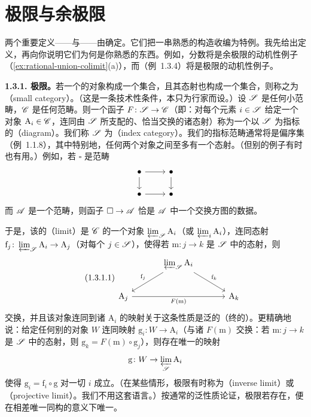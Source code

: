 \section{极限与余极限}

两个重要定义——\trLimit{}与\trColimit——由\trUniversalProperty{}确定。它们把一串熟悉的构造收编为特例。我先给出定义，再向你说明它们为何是你熟悉的东西。例如，分数将是余极限的动机性例子（\cref{ex:rational-union-colimit}(a)），而\trPadicIntegers{}（例~1.3.4）将是极限的动机性例子。

\textbf{1.3.1. 极限。}\quad 若一个\trCategory{}的对象构成一个集合，且其态射也构成一个集合，则称之为\textbf{\trSmallCategory}（small category）。（这是一条技术性条件，本只为行家而设。）设 $\mathscr{S}$ 是任何小范畴，$\mathscr{C}$ 是任何范畴。则一个函子 $F\colon\mathscr{S}\to\mathscr{C}$（即：对每个元素 $i\in\mathscr{S}$ 给定一个对象 $\mathrm{A}_i\in\mathscr{C}$，连同由 $\mathscr{S}$ 所支配的、恰当交换的诸态射）称为一个以 $\mathscr{S}$ 为指标的\textbf{\trDiagram}（diagram）。我们称 $\mathscr{S}$ 为\textbf{\trIndexCategory}（index category）。我们的指标范畴通常将是偏序集（例~1.1.8），其中特别地，任何两个对象之间至多有一个态射。（但别的例子有时也有用。）例如，若 $\square$ 是范畴
\[
\begin{tikzcd}[row sep=1.5em, column sep=2.4em]
\bullet \ar[r] \ar[d] & \bullet \ar[d] \\
\bullet \ar[r] & \bullet
\end{tikzcd}
\]
而 $\mathscr{A}$ 是一个范畴，则函子 $\square\to\mathscr{A}$ 恰是 $\mathscr{A}$ 中一个交换方图的数据。

于是，该\trDiagram{}的\textbf{\trLimit}（limit）是 $\mathscr{C}$ 的一个对象 $\varprojlim_{\mathscr{S}}\mathrm{A}_i$（或 $\varprojlim_i\mathrm{A}_i$），连同态射 $\mathrm{f}_j\colon\varprojlim_{\mathscr{S}}\mathrm{A}_i\to\mathrm{A}_j$（对每个 $j\in\mathscr{S}$），使得若 $\mathrm{m}\colon j\to k$ 是 $\mathscr{S}$ 中的态射，则
\begin{equation*}\tag{1.3.1.1}\label{eq:limit-cone-diagram}
\begin{tikzcd}[row sep=2.1em, column sep=3.4em]
 & \varprojlim_{\scr{S}}\mathrm{A}_i \ar[dl,"\mathrm{f}_j"'] \ar[dr,"\mathrm{f}_k"] & \\
\mathrm{A}_j \ar[rr,"F(\mathrm{m})"'] & & \mathrm{A}_k
\end{tikzcd}
\end{equation*}
交换，并且该对象连同到诸 $\mathrm{A}_i$ 的映射关于这条性质是泛的（终的）。更精确地说：给定任何别的对象 $W$ 连同映射 $\mathrm{g}_i\colon W\to\mathrm{A}_i$（与诸 $F(\mathrm{m})$ 交换：若 $\mathrm{m}\colon j\to k$ 是 $\mathscr{S}$ 中的态射，则 $\mathrm{g}_k=F(\mathrm{m})\circ\mathrm{g}_j$），则存在唯一的映射
\[
\mathrm{g}\colon W\to\varprojlim_{\mathscr{S}}\mathrm{A}_i
\]
使得 $\mathrm{g}_i=\mathrm{f}_i\circ\mathrm{g}$ 对一切 $i$ 成立。（在某些情形，极限有时称为\trInverseLimit{}（inverse limit）或\trProjectiveLimit{}（projective limit）。我们不用这套语言。）按通常的泛性质论证，极限若存在，便在相差唯一同构的意义下唯一。

